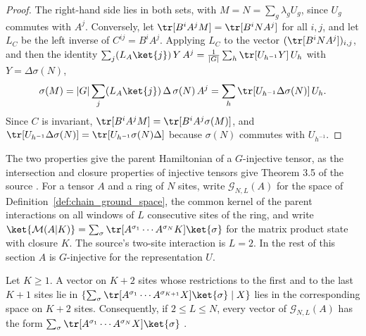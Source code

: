 \begin{proof}\leanok
    The right-hand side lies in both sets, with $M=N=\sum_g\lambda_gU_g$,
    since $U_g$ commutes with $A^j$. Conversely, let
    $\tr[B^iA^jM]=\tr[B^iNA^j]$ for all $i,j$, and let $L_C$ be the left
    inverse of $C^{ij}=B^iA^j$. Applying $L_C$ to the vector
    $(\tr[B^iNA^j])_{i,j}$, and then the identity
    $\sum_j(L_A\ket{j})\,Y\,A^j=\frac{1}{|G|}\sum_h\tr[U_{h^{-1}}Y]\,U_h$ with
    $Y=\Delta\sigma(N)$,
    \begin{align*}
        \sigma(M)=|G|\sum_j(L_A\ket{j})\,\Delta\,\sigma(N)\,A^j
        =\sum_h\tr[U_{h^{-1}}\Delta\sigma(N)]\,U_h .
    \end{align*}
    Since $C$ is invariant, $\tr[B^iA^jM]=\tr[B^iA^j\sigma(M)]$, and
    $\tr[U_{h^{-1}}\Delta\sigma(N)]=\tr[U_{h^{-1}}\sigma(N)\Delta]$ because
    $\sigma(N)$ commutes with $U_{h^{-1}}$.
\end{proof}

The two properties give the parent Hamiltonian of a $G$-injective tensor, as
the intersection and closure properties of injective tensors give Theorem 3.5
of the source \cite[Section~``Parent Hamiltonians'']{Schuch2010PEPS}. For a
tensor $A$ and a ring of $N$ sites, write $\mathcal G_{N,L}(A)$ for the space
of Definition~\ref{def:chain_ground_space}, the common kernel of the parent
interactions on all windows of $L$ consecutive sites of the ring, and write
$\ket{\mathcal M(A|K)}=\sum_{\sigma}\tr[A^{\sigma_1}\cdots A^{\sigma_N}K]
    \ket{\sigma}$ for the matrix product state with closure $K$. The source's
two-site interaction is $L=2$. In the rest of this section $A$ is
$G$-injective for the representation $U$.

\begin{lemma}%
    \label{lem:peps_mps_g_injective_open_chain}
    \leanok
    Let $K\ge1$. A vector on $K+2$ sites whose restrictions to the first and to
    the last $K+1$ sites lie in
    $\{\sum_{\sigma}\tr[A^{\sigma_1}\cdots A^{\sigma_{K+1}}X]\ket{\sigma}\mid X\}$
    lies in the corresponding space on $K+2$ sites. Consequently, if
    $2\le L\le N$, every vector of $\mathcal G_{N,L}(A)$ has the form
    $\sum_{\sigma}\tr[A^{\sigma_1}\cdots A^{\sigma_N}X]\ket{\sigma}$
    \cite[Section~``Parent Hamiltonians'']{Schuch2010PEPS}.
\end{lemma}

